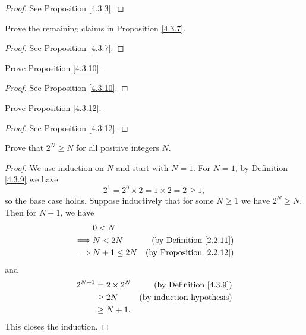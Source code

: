 \begin{proof}
    See Proposition \ref{4.3.3}.
\end{proof}

\begin{exercise}\label{ex 4.3.2}
    Prove the remaining claims in Proposition \ref{4.3.7}.
\end{exercise}

\begin{proof}
    See Proposition \ref{4.3.7}.
\end{proof}

\begin{exercise}\label{ex 4.3.3}
    Prove Proposition \ref{4.3.10}.
\end{exercise}

\begin{proof}
    See Proposition \ref{4.3.10}.
\end{proof}

\begin{exercise}
    Prove Proposition \ref{4.3.12}.
\end{exercise}

\begin{proof}
    See Proposition \ref{4.3.12}.
\end{proof}

\begin{exercise}\label{ex 4.3.5}
    Prove that \(2^N \geq N\) for all positive integers \(N\).
\end{exercise}

\begin{proof}
    We use induction on \(N\) and start with \(N = 1\).
    For \(N = 1\), by Definition \ref{4.3.9} we have
    \[
        2^1 = 2^0 \times 2 = 1 \times 2 = 2 \geq 1,
    \]
    so the base case holds.
    Suppose inductively that for some \(N \geq 1\) we have \(2^N \geq N\).
    Then for \(N + 1\), we have
    \begin{align*}
                 & 0 < N                                                \\
        \implies & N < 2N        & \text{(by Definition \ref{2.2.11})}  \\
        \implies & N + 1 \leq 2N & \text{(by Proposition \ref{2.2.12})}
    \end{align*}
    and
    \begin{align*}
        2^{N + 1} & = 2 \times 2^N & \text{(by Definition \ref{4.3.9})} \\
                  & \geq 2N        & \text{(by induction hypothesis)}   \\
                  & \geq N + 1.
    \end{align*}
    This closes the induction.
\end{proof}
